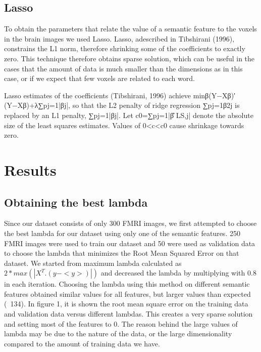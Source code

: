 \documentclass{article} %
\begin{document}
\subsection{Lasso}

To obtain the parameters that relate the value of a semantic feature to the voxels in the brain images we used Lasso. Lasso,  adescribed in Tibshirani (1996), constrains the L1 norm, therefore shrinking some of the coefficients to exactly zero. This technique therefore obtains sparse solution, which can be useful in the cases that the amount of data is much smaller than the dimensions as in this case, or if we expect that few voxels are related to each word. 

Lasso estimates of the coefficients (Tibshirani, 1996) achieve minβ(Y−Xβ)′(Y−Xβ)+λ∑pj=1|βj|, so that the L2 penalty of ridge regression ∑pj=1β2j is replaced by an L1 penalty, ∑pj=1|βj|. Let c0=∑pj=1|β̂ LS,j| denote the absolute size of the least squares estimates. Values of 0<c<c0 cause shrinkage towards zero.


\section{Results}


\subsection{Obtaining the best lambda}
Since our dataset consists of only 300 FMRI images, we first attempted to choose the best lambda for our dataset using only one of the semantic features. 250 FMRI images were used to train our dataset and 50 were used as validation data to choose the lambda that minimizes the Root Mean Squared Error on that dataset. We started from maximum lambda calculated as $2 * max (|X^T.(y - <y>)|)$ and decreased the lambda by multiplying with 0.8 in each iteration. Choosing the lambda using this method on different semantic features obtained similar values for all features, but larger values than expected (~134). In figure 1, it is shown the root mean square error on the training data and validation data versus different lambdas. This creates a very sparse solution and setting most of the features to 0. The reason behind the large values of lambda may be due to the nature of the data, or the large dimensionality compared to the amount of training data we have.
\end{document}
